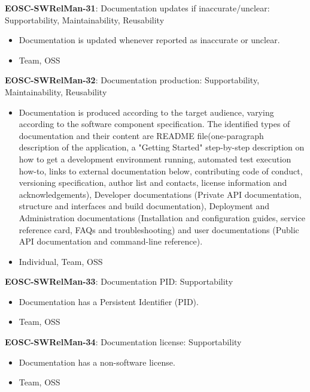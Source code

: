 \textbf{EOSC-SWRelMan-31}: Documentation updates if inaccurate/unclear: Supportability, Maintainability, Reusability

\begin{itemize}
    \item Documentation is updated whenever reported as inaccurate or unclear. \cite{orviz_set_2017,orviz_fernandez_eosc-synergy_2020}
    \item Team, OSS
\end{itemize}

\textbf{EOSC-SWRelMan-32}: Documentation production: Supportability, Maintainability, Reusability

\begin{itemize}
    \item Documentation is produced according to the target audience, varying according to the software component specification. The identified types of documentation and their content are README file(one-paragraph description of the application, a "Getting Started" step-by-step description on how to get a development environment running, automated test execution how-to, links to external documentation below, contributing code of conduct, versioning specification, author list and contacts, license information and acknowledgements), Developer documentations (Private API documentation, structure and interfaces and build documentation), Deployment and Administration documentations (Installation and configuration guides, service reference card, FAQs and troubleshooting) and user documentations (Public API documentation and command-line reference). \cite{aberdour_achieving_2007,shepherdson_cessda_2019,orviz_set_2017,orviz_fernandez_eosc-synergy_2020,raymond_software_2013}
    \item Individual, Team, OSS
\end{itemize}

\textbf{EOSC-SWRelMan-33}: Documentation PID: Supportability

\begin{itemize}
    \item Documentation has a Persistent Identifier (PID). \cite{orviz_fernandez_eosc-synergy_2020}
    \item Team, OSS
\end{itemize}

\textbf{EOSC-SWRelMan-34}: Documentation license: Supportability

\begin{itemize}
    \item Documentation has a non-software license. \cite{orviz_fernandez_eosc-synergy_2020}
    \item Team, OSS
\end{itemize}

